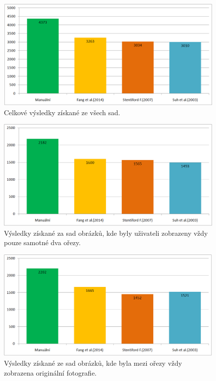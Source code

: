 \begin{figure}[H]
	\centering
	\includegraphics[scale=0.6]{obrazky/TESTtotal.png}
	\caption{Celkové výsledky získané ze všech sad.}
\label{obr:TestTotal}
\end{figure}

\begin{figure}[H]
	\centering
	\includegraphics[scale=0.6]{obrazky/TESTwithoutRef.png}
    \caption{Výsledky získané za sad obrázků, kde byly uživateli zobrazeny vždy pouze samotné dva ořezy.}
\label{obr:TestWithoutRef}
\end{figure}

\begin{figure}[H]
	\centering
	\includegraphics[scale=0.6]{obrazky/TESTwithRef.png}
    \caption{Výsledky získané ze sad obrázků, kde byla mezi ořezy vždy zobrazena originální fotografie.}
\label{obr:TestWithRef}
\end{figure}

